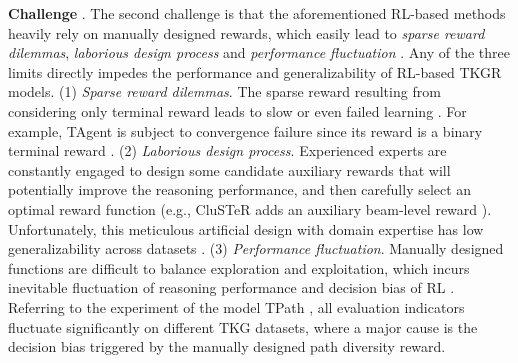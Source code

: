 \documentclass[sigconf,natbib=true]{acmart}
\begin{document}
\textbf{Challenge \uppercase\expandafter{}}. The second challenge is that the aforementioned RL-based  methods heavily rely on manually designed rewards, which easily lead to \emph{sparse reward dilemmas}, \emph{laborious design process} and \emph{performance fluctuation} \cite{rewardRL}. Any of the three limits directly impedes the performance and generalizability of RL-based TKGR models. 
(1) \emph{Sparse reward dilemmas}. The sparse reward resulting from considering only terminal reward leads to slow or even failed learning \cite{MultiHop, rewardRLcon}. For example, TAgent is subject to convergence failure since its reward is a binary terminal reward \cite{TAgent}.%
(2) \emph{Laborious design process}. Experienced experts are constantly engaged to design some candidate auxiliary rewards that will potentially improve the reasoning performance, and then carefully select an optimal reward function (e.g., CluSTeR adds an auxiliary beam-level reward  \cite{Cluster}). Unfortunately, this meticulous artificial design with domain expertise has low generalizability across datasets \cite{generaRL, RLregener}. (3) \emph{Performance fluctuation}. Manually designed functions are difficult to balance exploration and exploitation, which incurs inevitable fluctuation of reasoning performance and decision bias of RL \cite{RLbalan, RLrewardBal}. Referring to the experiment of the model TPath \cite{TPath}, all evaluation indicators fluctuate significantly on different TKG datasets, where a major cause is the decision bias triggered by the manually designed path diversity reward.
\end{document}
